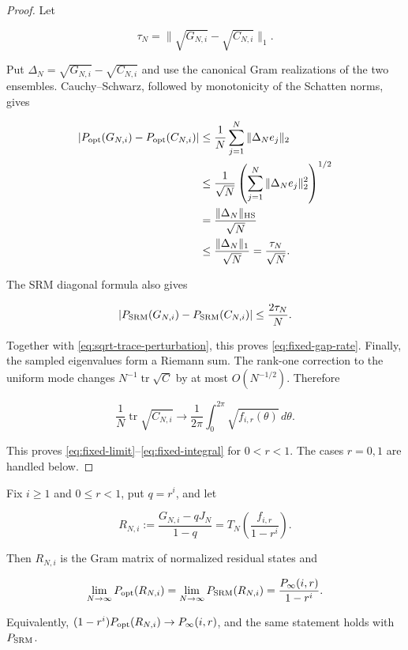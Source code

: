 \begin{proof}
Let

\[
\tau_N=\|\sqrt{G_{N,i}}-\sqrt{C_{N,i}}\|_1.
\]

Put \(\Delta_N=\sqrt{G_{N,i}}-\sqrt{C_{N,i}}\) and use the canonical Gram
realizations of the two ensembles. Cauchy--Schwarz, followed by monotonicity
of the Schatten norms, gives

\begin{align}\label{eq:opt-circulant-transfer}
|P_{\rm opt}(G_{N,i})-P_{\rm opt}(C_{N,i})|
&\le\frac1N\sum_{j=1}^N\|\Delta_Ne_j\|_2 \notag\\
&\le\frac1{\sqrt N}
\left(\sum_{j=1}^N\|\Delta_Ne_j\|_2^2\right)^{1/2} \notag\\
&=\frac{\|\Delta_N\|_{\rm HS}}{\sqrt N}
\notag\\
&\le\frac{\|\Delta_N\|_1}{\sqrt N}
=\frac{\tau_N}{\sqrt N}.
\end{align}

The SRM diagonal formula also gives

\[
|P_{\rm SRM}(G_{N,i})-P_{\rm SRM}(C_{N,i})|
\le\frac{2\tau_N}{N}.
\]

Together with \eqref{eq:sqrt-trace-perturbation}, this proves
\eqref{eq:fixed-gap-rate}. Finally, the sampled eigenvalues form a Riemann
sum. The rank-one correction to the uniform mode changes
\(N^{-1}\operatorname{tr}\sqrt C\) by at most \(O(N^{-1/2})\). Therefore

\[
\frac1N\operatorname{tr}\sqrt{C_{N,i}}
\longrightarrow
\frac1{2\pi}\int_0^{2\pi}\sqrt{f_{i,r}(\theta)}\,d\theta.
\]

This proves \eqref{eq:fixed-limit}--\eqref{eq:fixed-integral} for \(0<r<1\). The cases \(r=0,1\) are handled below.
\end{proof}

\begin{lemma}
Fix \(i\ge1\) and \(0\le r<1\), put \(q=r^i\), and let

\[
R_{N,i}:=\frac{G_{N,i}-qJ_N}{1-q}
=T_N\!\left(\frac{f_{i,r}}{1-r^i}\right).
\]

Then \(R_{N,i}\) is the Gram matrix of normalized residual states and

\begin{equation}\label{eq:residual-toeplitz-limit}
\lim_{N\to\infty}P_{\rm opt}(R_{N,i})
=\lim_{N\to\infty}P_{\rm SRM}(R_{N,i})
=\frac{P_\infty(i,r)}{1-r^i}.
\end{equation}

Equivalently,
\((1-r^i)P_{\rm opt}(R_{N,i})\to P_\infty(i,r)\), and the same statement
holds with \(P_{\rm SRM}\).
\end{lemma}

